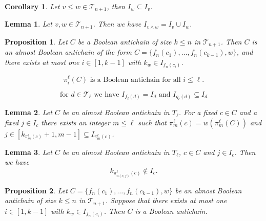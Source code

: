 \documentclass[10pt,a4paper]{amsart}
\newtheorem{lemma}{Lemma}
\newtheorem{proposition}{Proposition}
\newtheorem{corollary}{Corollary}
\newcommand{\cT}{\mathcal{T}}
\begin{document}
\begin{corollary}\label{cor: closing parenthesis moved to the right}
    Let $v \leq w \in \cT_{n+1}$, then $I_w \subseteq I_v$.
\end{corollary}

\begin{lemma}\label{lem: meet height is union}
    Let $v,w \in \cT_{n+1}$. Then we have $I_{v \wedge w} = I_v \cup I_w$.
\end{lemma}

\begin{proposition}\label{prop: BooleanAreValid}
    Let $C$ be a Boolean antichain of size $k\leq n$ in $\cT_{n+1}$. Then $C$ is an almost Boolean antichain of the form $C=\{f_n(c_1),\dots,f_n(c_{k-1}),w\}$, and there exists at most one $i \in [1, k-1]$ with $k_w \in I_{f_n(c_i)}$.
\end{proposition}

\begin{equation}\label{eq: pi of C Boolean}
    \pi_i^\ell(C) \text{ is a Boolean antichain for all } i\leq \ell.
\end{equation}

\begin{equation}\label{eq: I_q_i}
    \text{for } d\in \cT_\ell \text{ we have }I_{f_\ell(d)} = I_d \text{ and } I_{q_\ell(d)}\subseteq I_d
\end{equation}

\begin{lemma}\label{lem: backtracking}
    Let $C$ be an almost Boolean antichain in $T_\ell$. For a fixed $c \in C$ and a fixed $j \in I_c$ there exists an integer $m \leq \ell$ such that
    $\pi_m^\ell(c) = w(\pi_m^\ell(C))$ and $j \in [k_{\pi_m^\ell(c)} + 1, m - 1] \subseteq I_{\pi_m^\ell(c)}$.
\end{lemma}

\begin{lemma}\label{lem: forwarding k}
    Let $C$ be an almost Boolean antichain in $T_\ell$, $c \in C$ and $j \in I_c$. Then we have
    \[
        k_{\pi_{n(c,j)}^\ell(c)} \notin I_c.
    \]
\end{lemma}

\begin{proposition}\label{prop: ValidAreBoolean}
    Let $C=\{f_n(c_1),\dots,f_n(c_{k-1}),w\}$ be an almost Boolean antichain of size $k\leq n$ in $\cT_{n+1}$. Suppose that there exists at most one $i \in [1,k-1]$ with $k_w \in I_{f_n(c_i)}$. Then $C$ is a Boolean antichain.
\end{proposition}
\end{document}
